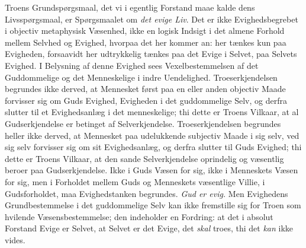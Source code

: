 \documentclass[12pt]{book}
\begin{document}
Troens Grundspørgsmaal, det vi i egentlig Forstand
maae kalde dens Livsspørgsmaal, er Spørgsmaalet om \emph{det evige
Liv}. Det er ikke Evighedsbegrebet i objectiv metaphysisk Væsenhed,
ikke en logisk Indsigt i det almene Forhold mellem Selvhed og
Evighed, hvorpaa det her kommer an: her tænkes kun paa Evigheden,
forsaavidt her udtrykkelig tænkes paa det Evige i Selvet, paa
Selvets Evighed. I Belysning af denne Evighed sees
Vexelbestemmelsen af det Guddommelige og det Menneskelige i indre
Uendelighed. Troeserkjendelsen begrundes ikke derved, at Mennesket
først paa en eller anden objectiv Maade forvisser sig om Guds
Evighed, Evigheden i det guddommelige Selv, og derfra slutter til et
Evighedsanlæg i det menneskelige; thi dette er Troens Vilkaar, at al
Gudserkjendelse er betinget af Selverkjendelse. Troeserkjendelsen
begrundes heller ikke derved, at Mennesket paa udelukkende subjectiv
Maade i sig selv, ved sig selv forvisser sig om sit Evighedsanlæg,
og derfra slutter til Guds Evighed; thi dette er Troens Vilkaar, at
den sande Selverkjendelse oprindelig og væsentlig beroer paa
Gudserkjendelse. Ikke i Guds Væsen for sig, ikke i Menneskets Væsen
for sig, men i Forholdet mellem Guds og Menneskets væsentlige
Villie, i Gudsforholdet, maa Evighedstanken begrundes. \emph{Gud er
evig.} Men Evighedens Grundbestemmelse i det guddommelige Selv kan
ikke fremstille sig for Troen som hvilende Væsensbestemmelse; den
indeholder en Fordring: at det i absolut Forstand Evige er Selvet,
at Selvet er det Evige, det \emph{skal} troes, thi det \emph{kan}
ikke vides.
\end{document}
